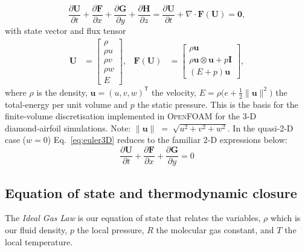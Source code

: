 \documentclass[11pt]{article}
\begin{document}
\begin{equation}
  \frac{\partial \mathbf{U}}{\partial t}
  + \frac{\partial \mathbf{F}}{\partial x}
  + \frac{\partial \mathbf{G}}{\partial y}
  + \frac{\partial \mathbf{H}}{\partial z} = \frac{\partial \mathbf{U}}{\partial t}
  + \nabla \cdot \mathbf{F}(\mathbf{U}) = \mathbf{0},
  \label{eq:euler3D}
\end{equation}
with state vector and flux tensor
\begin{align}
  \mathbf{U} &=
  \begin{bmatrix}
    \rho\\
    \rho u\\
    \rho v\\
    \rho w\\
    E
  \end{bmatrix}, &
  \mathbf{F}(\mathbf{U}) &=
  \begin{bmatrix}
    \rho \mathbf{u}\\[2pt]
    \rho \mathbf{u}\otimes\mathbf{u} + p\mathbf{I}\\[2pt]
    (E+p)\mathbf{u}
  \end{bmatrix},
\end{align}
where $\rho$ is the density, $\mathbf{u}=(u,v,w)^{\mathsf{T}}$ the
velocity, $E=\rho\bigl(e+\tfrac12\lVert\mathbf{u}\rVert^{2}\bigr)$ the total‐energy
per unit volume and $p$ the static pressure. This is the basis for the finite‑volume discretisation implemented in \textsc{OpenFOAM} for the 3‑D diamond‑airfoil simulations. Note: $\lVert\mathbf{u}\rVert \;=\; \sqrt{u^{2}+v^{2}+w^{2}}.$
\vspace{2.5mm}
In the quasi‑2‑D case ($w\!=\!0$) Eq.~\eqref{eq:euler3D} reduces to the familiar 2‑D expressions below:
\begin{equation}
   \frac{\partial \textbf{U}}{\partial t} + \frac{\partial \textbf{F}}{\partial x} + \frac{\partial \textbf{G}}{\partial y} = 0
\end{equation}

\subsection{Equation of state and thermodynamic closure}
The \textit{Ideal Gas Law} is our equation of state that relates the variables, $\rho$ which is our fluid density, $p$ the local pressure, $R$ the molecular gas constant, and $T$ the local temperature. 
\end{document}

